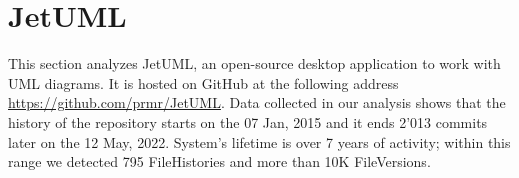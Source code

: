 
\section{JetUML}
This section analyzes JetUML, an open-source desktop application to work with UML diagrams. It is hosted on GitHub at the following address \url{https://github.com/prmr/JetUML}. Data collected in our analysis shows that the history of the repository starts on the 07 Jan, 2015 and it ends 2'013 commits later on the 12 May, 2022. System's lifetime is over 7 years of activity; within this range we detected 795 FileHistories and more than 10K FileVersions.

